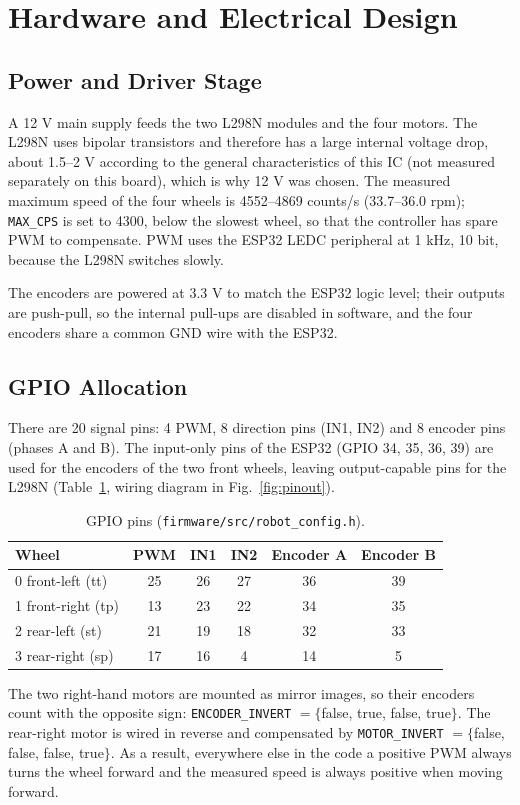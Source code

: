 \documentclass[11pt,a4paper]{article}
\newcommand{\code}[1]{\texttt{\small #1}}
\begin{document}
\section{Hardware and Electrical Design}
\subsection{Power and Driver Stage}
A 12 V main supply feeds the two L298N modules and the four motors. The L298N uses bipolar transistors and therefore has a large internal voltage drop, about 1.5--2 V according to the general characteristics of this IC (not measured separately on this board), which is why 12 V was chosen. The measured maximum speed of the four wheels is 4552--4869 counts/s (33.7--36.0 rpm); \code{MAX\_CPS} is set to 4300, below the slowest wheel, so that the controller has spare PWM to compensate. PWM uses the ESP32 LEDC peripheral at 1 kHz, 10 bit, because the L298N switches slowly.

The encoders are powered at 3.3 V to match the ESP32 logic level; their outputs are push-pull, so the internal pull-ups are disabled in software, and the four encoders share a common GND wire with the ESP32.

\subsection{GPIO Allocation}
There are 20 signal pins: 4 PWM, 8 direction pins (IN1, IN2) and 8 encoder pins (phases A and B). The input-only pins of the ESP32 (GPIO 34, 35, 36, 39) are used for the encoders of the two front wheels, leaving output-capable pins for the L298N (Table~\ref{tab:pins}, wiring diagram in Fig.~\ref{fig:pinout}).

\begin{table}[H]
\caption{GPIO pins (\code{firmware/src/robot\_config.h}).}
\label{tab:pins}
\centering\small
\begin{tabular}{lccccc}
\toprule
Wheel & PWM & IN1 & IN2 & Encoder A & Encoder B \\
\midrule
0 front-left (tt)  & 25 & 26 & 27 & 36 & 39 \\
1 front-right (tp) & 13 & 23 & 22 & 34 & 35 \\
2 rear-left (st)   & 21 & 19 & 18 & 32 & 33 \\
3 rear-right (sp)  & 17 & 16 & 4  & 14 & 5  \\
\bottomrule
\end{tabular}
\end{table}
The two right-hand motors are mounted as mirror images, so their encoders count with the opposite sign: \code{ENCODER\_INVERT} $=\{$false, true, false, true$\}$. The rear-right motor is wired in reverse and compensated by \code{MOTOR\_INVERT} $=\{$false, false, false, true$\}$. As a result, everywhere else in the code a positive PWM always turns the wheel forward and the measured speed is always positive when moving forward.
\end{document}
